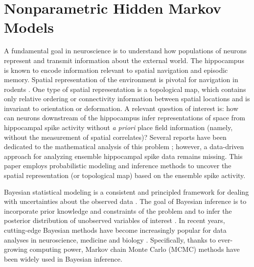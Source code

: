  
\chapter{Nonparametric Hidden Markov Models}



A fundamental goal in neuroscience is to understand how populations of
neurons represent and transmit information about the external world.
The hippocampus is known to encode information relevant to spatial
navigation and episodic memory.  Spatial representation of the
environment is pivotal for navigation in rodents \citep{OKeefe78}.
One type of spatial representation is a topological map, which
contains only relative ordering or connectivity information between
spatial locations and is invariant to orientation or deformation. A
relevant question of interest is: how can neurons downstream of the
hippocampus infer representations of space from hippocampal spike
activity without {\em a priori} place field information (namely,
without the measurement of spatial correlates)?  Several reports have
been dedicated to the mathematical analysis of this problem
\citep{Curto08,Dabaghian12}; however, a data-driven approach for
analyzing ensemble hippocampal spike data remains missing.  This paper
employs probabilistic modeling and inference methods to uncover the
spatial representation (or topological map) based on the ensemble
spike activity.


Bayesian statistical modeling is a consistent and principled framework
for dealing with uncertainties about the observed data
\citep{Scott02}.  The goal of Bayesian inference is to incorporate
prior knowledge and constraints of the problem and to infer the
posterior distribution of unobserved variables of interest
\citep{Gelman13}. In recent years, cutting-edge Bayesian methods have
become increasingly popular for data analyses in neuroscience,
medicine and biology
\citep{Mishchenko11a,Chen11,Chen13,Davidson09,Kloosterman14,Yau11}. Specifically,
thanks to ever-growing computing power, Markov chain Monte Carlo
(MCMC) methods have been widely used in Bayesian inference.


